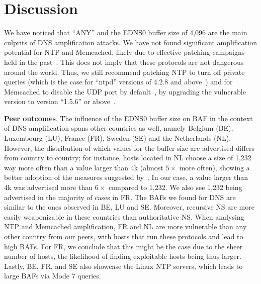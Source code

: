 \section{Discussion}

 We have noticed that ``ANY'' and the EDNS0 buffer size of 4,096 are the main culprits of DNS amplification attacks. We have not found significant amplification potential for NTP and Memcached, likely due to effective patching campaigns held in the past~\cite{exit_hell}. This does not imply that these protocols are not dangerous around the world. Thus, we still recommend patching NTP to turn off private queries (which is the case for ``ntpd'' versions of 4.2.8 and above~\cite{ntpd-patched}) and for Memcached to disable the UDP port by default~\cite{memcached-fixed}, by upgrading the vulnerable version to version ``1.5.6'' or above~\cite{memcached-fixed-version}.

 \textbf{Peer outcomes}. The influence of the EDNS0 buffer size on BAF in the context of DNS amplification spans other countries as well, namely Belgium (BE), Luxembourg (LU), France (FR), Sweden (SE) and the Netherlands (NL). However, the distribution of which values for the buffer size are advertised differs from country to country; for instance, hosts located in NL choose a size of 1,232 way more often than a value larger than 4k (almost $5\times$ more often), showing a better adoption of the measures suggested by~\cite{dnsflagday}. In our case, a value larger than 4k was advertised more than $6\times$ compared to 1,232. We also see 1,232 being advertised in the majority of cases in FR. The BAFs we found for DNS are similar to the ones observed in BE, LU and SE. Moreover, recursive NS are more easily weaponizable in these countries than authoritative NS. When analysing NTP and Memcached amplification, FR and NL are more vulnerable than any other country from our peers, with hosts that run these protocols and lead to high BAFs. For FR, we conclude that this might be the case due to the sheer number of hosts, the likelihood of finding exploitable hosts being thus larger. Lastly, BE, FR, and SE also showcase the Linux NTP servers, which leads to large BAFs via Mode 7 queries.


